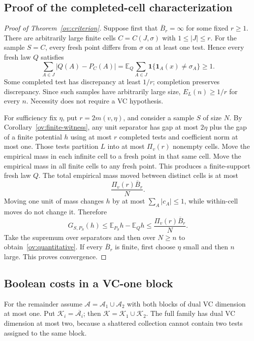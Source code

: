\subsection{Proof of the completed-cell characterization}
\begin{proof}[Proof of Theorem~\ref{ov:criterion}]
Suppose first that $\overline B_r=\infty$ for some fixed $r\ge1$. There are arbitrarily large finite cells $C=C(J,\sigma)$ with $1\le |J|\le r$. For the sample $S=C$, every fresh point differs from $\sigma$ on at least one test. Hence every fresh law $Q$ satisfies
\[
 \sum_{A\in J}|Q(A)-P_C(A)|
 =\mathbb E_Q\sum_{A\in J}\mathbf1\{\mathbf1_A(x)\ne\sigma_A\}\ge1.
\]
Some completed test has discrepancy at least $1/r$; completion preserves discrepancy. Since such samples have arbitrarily large size, $E_L(n)\ge1/r$ for every $n$. Necessity does not require a VC hypothesis.

For sufficiency fix $\eta$, put $r=2m(v,\eta)$, and consider a sample $S$ of size $N$. By Corollary~\ref{ov:finite-witness}, any unit separator has gap at most $2\eta$ plus the gap of a finite potential $h$ using at most $r$ completed tests and coefficient norm at most one. Those tests partition $L$ into at most $\Pi_v(r)$ nonempty cells. Move the empirical mass in each infinite cell to a fresh point in that same cell. Move the empirical mass in all finite cells to any fresh point. This produces a finite-support fresh law $Q$. The total empirical mass moved between distinct cells is at most
\[
 \frac{\Pi_v(r)\overline B_r}{N}.
\]
Moving one unit of mass changes $h$ by at most $\sum_A|c_A|\le1$, while within-cell moves do not change it. Therefore
\[
 G_{S,P_S}(h)\le\mathbb E_{P_S}h-\mathbb E_Qh
 \le\frac{\Pi_v(r)\overline B_r}{N}.
\]
Take the supremum over separators and then over $N\ge n$ to obtain~\eqref{ov:quantitative}. If every $\overline B_r$ is finite, first choose $\eta$ small and then $n$ large. This proves convergence.
\end{proof}

\subsection{Boolean costs in a VC-one block}
For the remainder assume $\mathcal A=\mathcal A_1\cup\mathcal A_2$ with both blocks of dual VC dimension at most one. Put $\mathcal K_i=\overline{\mathcal A_i}$; then $\mathcal K=\mathcal K_1\cup\mathcal K_2$. The full family has dual VC dimension at most two, because a shattered collection cannot contain two tests assigned to the same block.

